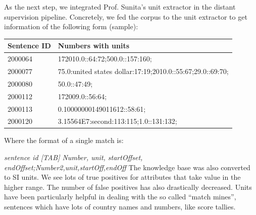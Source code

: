 \documentclass[a4paper,10pt]{article}
\begin{document}
As the next step, we integrated Prof. Sunita's unit extractor in the distant supervision pipeline.
Concretely, we fed the corpus to the unit extractor to get information of the following form
(sample):
\begin{center}
 
\begin{tabular}{|l|l|}
\hline
Sentence ID & Numbers with units \\
\hline
2000064&172010.0::64:72;500.0::157:160;\\
2000077&75.0:united states dollar:17:19;2010.0::55:67;29.0::69:70;\\
2000080&50.0::47:49;\\
2000112&172009.0::56:64;\\
2000113&0.10000000149011612::58:61;\\
2000120&3.15564E7:second:113:115;1.0::131:132;\\
\hline
\end{tabular}

\end{center}

Where the format of a single match is:

\emph{sentence id [TAB] Number, unit, startOffset, endOffset;Number2,unit,startOff,endOff}
The knowledge base was also converted to SI units.
We see lots of true positives for attributes that take value in the higher range. The number of false
positives has also drastically decreased. Units have been particularly helpful in dealing with the so
called “match mines”, sentences which have lots of country names and numbers, like score tallies.
\end{document}
